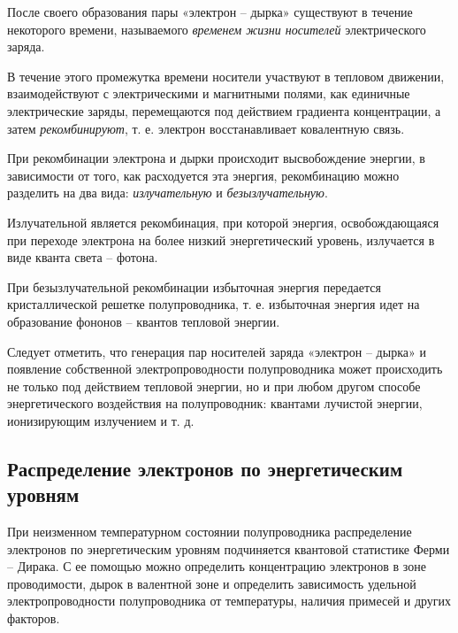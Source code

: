 	\par После своего образования пары «электрон – дырка» существуют в течение некоторого времени, называемого \textit{временем жизни носителей} электрического заряда.
	
	\par В течение этого промежутка времени носители участвуют в тепловом движении, взаимодействуют с электрическими и магнитными полями, как единичные электрические заряды, перемещаются под действием градиента концентрации, а затем \textit{рекомбинируют}, т. е. электрон восстанавливает ковалентную связь.
	
	\par При рекомбинации электрона и дырки происходит высвобождение энергии, в зависимости от того, как расходуется эта энергия, рекомбинацию можно разделить на два вида: \textit{излучательную} и \textit{безызлучательную}.
	
	\par Излучательной является рекомбинация, при которой энергия, освобождающаяся при переходе электрона на более низкий энергетический уровень, излучается в виде кванта света – фотона.
	
	\par При безызлучательной рекомбинации избыточная энергия передается кристаллической решетке полупроводника, т. е. избыточная энергия идет на образование фононов – квантов тепловой энергии.
	
	\par Следует отметить, что генерация пар носителей заряда «электрон – дырка» и появление собственной электропроводности полупроводника может происходить не только под действием тепловой энергии, но и при любом другом способе энергетического воздействия на полупроводник: квантами лучистой энергии, ионизирующим излучением и т. д.

	\subsection{Распределение электронов по энергетическим уровням}
	
	\par При неизменном температурном состоянии полупроводника распределение электронов по	энергетическим уровням подчиняется квантовой статистике Ферми – Дирака. С ее помощью можно	определить концентрацию электронов в зоне проводимости, дырок в валентной зоне и определить зависимость удельной электропроводности полупроводника от температуры, наличия примесей и	других факторов.
	
